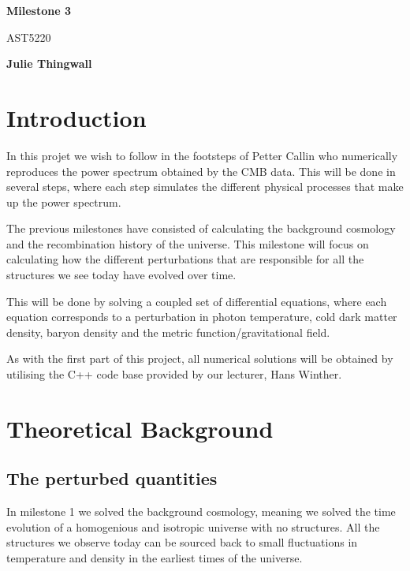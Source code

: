 \documentclass[12pt]{article}
\begin{document}
    \begin{titlepage}
        \begin{center}
            \vspace*{5cm}
            
            \Huge
            \textbf{Milestone 3}
            
            \vspace*{0.5cm}
            \LARGE
            AST5220
        
            \vspace*{0.5cm}
        
            \textbf{Julie Thingwall}
        \end{center}
    \end{titlepage}

\section{Introduction}

In this projet we wish to follow in the footsteps of Petter Callin\cite{callin2006calculate} who numerically reproduces the power spectrum obtained by the CMB data. This will be done in several steps, where each step simulates the different physical processes that make up the power spectrum.

The previous milestones have consisted of calculating the background cosmology and the recombination history of the universe. This milestone will focus on calculating how the different perturbations that are responsible for all the structures we see today have evolved over time. 

This will be done by solving a coupled set of differential equations, where each equation corresponds to a perturbation in photon temperature, cold dark matter density, baryon density and the metric function/gravitational field. 

As with the first part of this project, all numerical solutions will be obtained by utilising the C++ code base provided by our lecturer, Hans Winther.


\section{Theoretical Background}
\subsection{The perturbed quantities}
In milestone 1 we solved the background cosmology, meaning we solved the time evolution of a homogenious and isotropic universe with no structures. All the structures we observe today can be sourced back to small fluctuations in temperature and density in the earliest times of the universe. 
\end{document}
